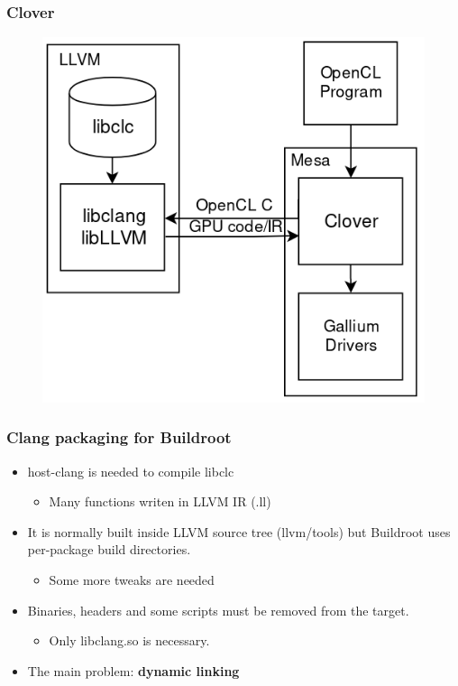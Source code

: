 \documentclass{beamer}
\begin{document}
\begin{frame}
\frametitle{Clover}
\begin{figure}
\includegraphics[width=0.7\linewidth]{img/clover.png}
\end{figure}
\end{frame}

\begin{frame}
\frametitle{Clang packaging for Buildroot}
\begin{itemize}
  \item host-clang is needed to compile libclc
  \begin{itemize}
    \item Many functions writen in LLVM IR (.ll)
  \end{itemize}
  \item It is normally built inside LLVM source tree (llvm/tools) but Buildroot
  uses per-package build directories.
  \begin{itemize}
    \item Some more tweaks are needed
  \end{itemize}
  \item Binaries, headers and some scripts must be removed from the target.
  \begin{itemize}
    \item Only libclang.so is necessary.
  \end{itemize}
  \item The main problem: \textbf{dynamic linking}
\end{itemize}
\end{frame}
\end{document}

